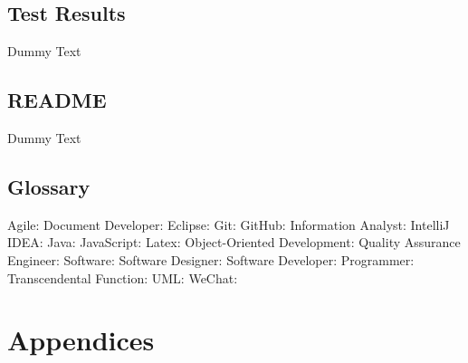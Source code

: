 \documentclass[12pt]{article}
\begin{document}
\subsection{Test Results}
Dummy Text

\subsection{README}
Dummy Text

\subsection{Glossary}
Agile: \newline
Document Developer: \newline
Eclipse: \newline
Git: \newline
GitHub: \newline
Information Analyst: \newline
IntelliJ IDEA: \newline
Java: \newline
JavaScript: \newline
Latex: \newline
Object-Oriented Development: \newline
Quality Assurance Engineer: \newline
Software: \newline
Software Designer: \newline
Software Developer: \newline
Programmer: \newline
Transcendental Function: \newline
UML: \newline
WeChat: \newline



\section{Appendices}
\end{document}
